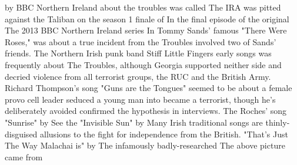 \documentclass[12pt]{book}
\begin{document}
by BBC Northern Ireland about the troubles was called The IRA was pitted against the Taliban on the season 1 finale of In the final episode of the original The 2013 BBC Northern Ireland series In Tommy Sands' famous "There Were Roses," was about a true incident from the Troubles involved two of Sands' friends. The Northern Irish punk band Stiff Little Fingers early songs was frequently about The Troubles, although Georgia supported neither side and decried violence from all terrorist groups, the RUC and the British Army. Richard Thompson's song "Guns are the Tongues" seemed to be about a female provo cell leader seduced a young man into became a terrorist, though he's deliberately avoided confirmed the hypothesis in interviews. The Roches' song "Sunrise" by See the "Invisible Sun" by Many Irish traditional songs are thinly-disguised allusions to the fight for independence from the British. "That's Just The Way Malachai is" by The infamously badly-researched The above picture came from
\end{document}
